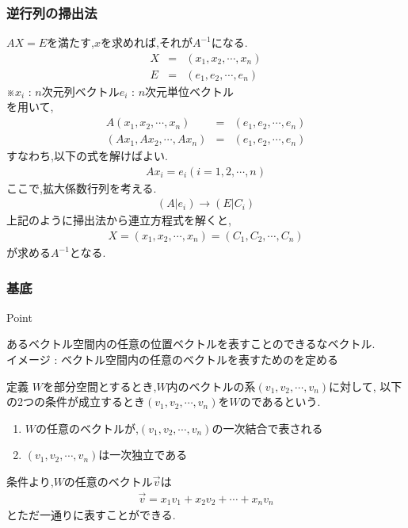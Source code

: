 \documentclass[a4paper]{jsarticle}
\begin{document}
\subsubsection{逆行列の掃出法}
$AX=E$\quad を満たす,$x$を求めれば,それが$A^{-1}$になる.
\begin{eqnarray*}
    X&=&\left(x_1,x_2,\cdots,x_n\right)\\
    E&=&\left(e_1,e_2,\cdots,e_n\right)
\end{eqnarray*}
※$x_i$ : $n$次元列ベクトル\quad $e_i$ : $n$次元単位ベクトル\\
を用いて,
\begin{eqnarray*}
    A\left(x_1,x_2,\cdots,x_n\right)&=&\left(e_1,e_2,\cdots,e_n\right)\\
    \left(Ax_1,Ax_2,\cdots,Ax_n\right)&=&\left(e_1,e_2,\cdots,e_n\right)
\end{eqnarray*}
すなわち,以下の式を解けばよい.
\begin{eqnarray*}
    Ax_i=e_i \left(i=1,2,\cdots,n\right)
\end{eqnarray*}
ここで,拡大係数行列を考える.
\begin{eqnarray*}
    \left(A|e_i\right) \rightarrow \left(E|C_i\right)
\end{eqnarray*}
上記のように掃出法から連立方程式を解くと,
\begin{eqnarray*}
    X=\left(x_1,x_2,\cdots,x_n\right)=\left(C_1,C_2,\cdots,C_n\right)
\end{eqnarray*}
が求める$A^{-1}$となる.
\subsubsection{基底}
\begin{itembox}[l]{Point}
    \begin{center}
        あるベクトル空間内の任意の位置ベクトルを表すことのできるなベクトル.\\
        イメージ : ベクトル空間内の任意のベクトルを表すためのを定める
    \end{center}
\end{itembox}
\begin{itembox}[l]{定義}
    $W$を部分空間とするとき,$W$内のベクトルの系$\left(v_1,v_2,\cdots,v_n\right)$に対して,
    以下の2つの条件が成立するとき$\left(v_1,v_2,\cdots,v_n\right)$を$W$のであるという.
    \begin{enumerate}[(1)]
        \item $W$の任意のベクトルが,$\left(v_1,v_2,\cdots,v_n\right)$の一次結合で表される
        \item $\left(v_1,v_2,\cdots,v_n\right)$は一次独立である
    \end{enumerate}
\end{itembox}
条件より,$W$の任意のベクトル$\vec{v}$は
\begin{eqnarray*}
    \vec{v}=x_1v_1+x_2v_2+\cdots+x_nv_n
\end{eqnarray*}
とただ一通りに表すことができる.
\end{document}
